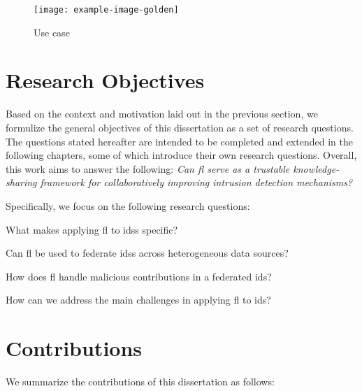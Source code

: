 \begin{figure}
  \centering
  \texttt{[image: example-image-golden]}
  \caption{Use case}
  \label{fig:intro.usecase}
\end{figure}

\section{Research Objectives\label{sec:intro.questions}}

Based on the context and motivation laid out in the previous section, we formulize the general objectives of this dissertation as a set of research questions.
The questions stated hereafter are intended to be completed and extended in the following chapters, some of which introduce their own research questions.
Overall, this work aims to answer the following: \emph{Can \gls{fl} serve as a trustable knowledge-sharing framework for collaboratively improving intrusion detection mechanisms?}

Specifically, we focus on the following research questions:

\begin{questions}
  \item What makes applying \gls{fl} to \glspl{ids} specific? \label{rq:intro.fids}
  \item Can \gls{fl} be used to federate \glspl{ids} across heterogeneous data sources? \label{rq:intro.heterogeneity}
  \item How does \gls{fl} handle malicious contributions in a federated \gls{ids}? \label{rq:intro.malicious}
  \item How can we address the main challenges in applying \gls{fl} to \gls{ids}? \label{rq:intro.propositions}
\end{questions}


\section{Contributions\label{sec:intro.contributions}}

We summarize the contributions of this dissertation as follows:


